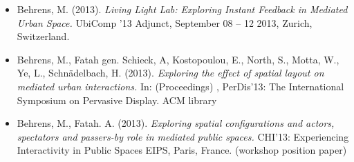 \begin{acknowledgements}
\begin{singlespace}
{\begin{itemize}
\item Behrens, M. (2013). \textit{Living Light Lab: Exploring Instant Feedback in Mediated Urban Space.} UbiComp ’13 Adjunct, September 08 – 12 2013, Zurich, Switzerland.
\item Behrens, M., Fatah gen. Schieck, A, Kostopoulou, E., North, S., Motta, W., Ye, L., Schnädelbach, H. (2013). \textit{Exploring the effect of spatial layout on mediated urban interactions.} In: (Proceedings) , PerDis’13: The International Symposium on Pervasive Display. ACM library
\item Behrens, M., Fatah. A. (2013). \textit{Exploring spatial configurations and actors, spectators and passers-by role in mediated public spaces.} CHI’13: Experiencing Interactivity in Public Spaces EIPS, Paris, France. (workshop position paper)


\end{itemize}}
\end{singlespace}
\end{acknowledgements}
